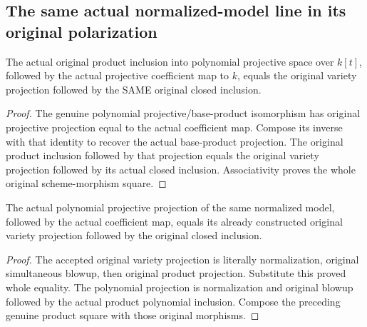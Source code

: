 \subsection{The same actual normalized-model line in its original polarization}

\begin{lemma}
\label{local:actual-product-polynomial-original-inclusion-square}
\leanok
{}
The actual original product inclusion into polynomial projective space over
$k[t]$, followed by the actual projective coefficient map to $k$, equals the
original variety projection followed by the SAME original closed inclusion.
\end{lemma}
\begin{proof}
The genuine polynomial projective/base-product isomorphism has original
projective projection equal to the actual coefficient map. Compose its
inverse with that identity to recover the actual base-product projection.
The original product inclusion followed by that projection equals the
original variety projection followed by its actual closed inclusion.
Associativity proves the whole original scheme-morphism square.
\end{proof}

\begin{lemma}
\label{local:actual-normalized-polynomial-original-inclusion-square}
\leanok
{}
The actual polynomial projective projection of the same normalized model,
followed by the actual coefficient map, equals its already constructed
original variety projection followed by the original closed inclusion.
\end{lemma}
\begin{proof}
The accepted original variety projection is literally normalization, original
simultaneous blowup, then original product projection. Substitute this proved
whole equality. The polynomial projection is normalization and original
blowup followed by the actual product polynomial inclusion. Compose the
preceding genuine product square with those original morphisms.
\end{proof}

